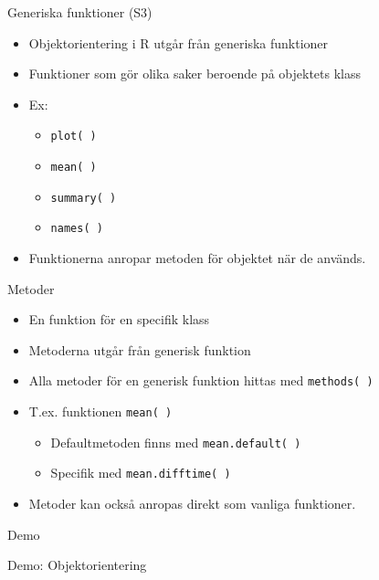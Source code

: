 \documentclass[
  11pt,
  ignorenonframetext,
  handout]{beamer}
\providecommand{\tightlist}{%
  \setlength{\itemsep}{0pt}\setlength{\parskip}{0pt}}
\begin{document}
\begin{frame}{Generiska funktioner (S3)}
\protect{}\label{generiska-funktioner-s3}
\begin{itemize}
\tightlist
\item
  Objektorientering i R utgår från generiska funktioner
\item
  Funktioner som gör olika saker beroende på objektets klass
\item
  Ex:

  \begin{itemize}
  \tightlist
  \item
    \texttt{plot( )}
  \item
    \texttt{mean( )}
  \item
    \texttt{summary( )}
  \item
    \texttt{names( )}
  \end{itemize}
\item
  Funktionerna anropar metoden för objektet när de används.
\end{itemize}
\end{frame}

\begin{frame}{Metoder}
\protect{}\label{metoder}
\begin{itemize}
\tightlist
\item
  En funktion för en specifik klass
\item
  Metoderna utgår från generisk funktion
\item
  Alla metoder för en generisk funktion hittas med \texttt{methods( )}
\item
  T.ex. funktionen \texttt{mean( )}

  \begin{itemize}
  \tightlist
  \item
    Defaultmetoden finns med \texttt{mean.default( )}
  \item
    Specifik med \texttt{mean.difftime( )}
  \end{itemize}
\item
  Metoder kan också anropas direkt som vanliga funktioner.
\end{itemize}
\end{frame}

\begin{frame}{Demo}
\protect{}\label{demo}
\begin{block}{Demo: Objektorientering}
\protect{}\label{demo-objektorientering}
\end{block}
\end{frame}
\end{document}
